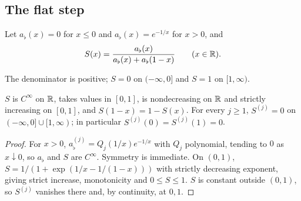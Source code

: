 \subsection{The flat step}\label{sec:pre-flat}

\begin{definition}\label{def:pre-flat}
Let $a_\flat(x)=0$ for $x\le0$ and $a_\flat(x)=e^{-1/x}$ for $x>0$, and
\[
 S(x)=\frac{a_\flat(x)}{a_\flat(x)+a_\flat(1-x)}\qquad(x\in\mathbb{R}).
\]
\end{definition}

The denominator is positive; $S=0$ on $(-\infty,0]$ and $S=1$ on $[1,\infty)$.

\begin{lemma}[Properties of $S$]\label{lem:pre-flat}
$S$ is $C^\infty$ on $\mathbb{R}$, takes values in $[0,1]$, is nondecreasing on $\mathbb{R}$ and strictly increasing on
$[0,1]$, and $S(1-x)=1-S(x)$. For every $j\ge1$, $S^{(j)}=0$ on $(-\infty,0]\cup[1,\infty)$; in particular
$S^{(j)}(0)=S^{(j)}(1)=0$.
\end{lemma}

\begin{proof}
For $x>0$, $a_\flat^{(j)}=Q_j(1/x)e^{-1/x}$ with $Q_j$ polynomial, tending to $0$ as $x\downarrow0$, so $a_\flat$ and $S$ are $C^\infty$. Symmetry is immediate. On $(0,1)$, $S=1/(1+\exp(1/x-1/(1-x)))$ with strictly decreasing exponent, giving strict increase, monotonicity and $0\le S\le1$. $S$ is constant outside $(0,1)$, so $S^{(j)}$ vanishes there and, by continuity, at $0,1$.
\end{proof}

